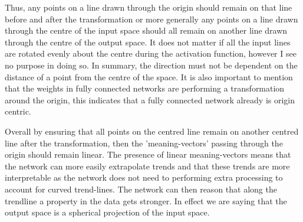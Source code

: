 \documentclass[onecolumn]{article}
\begin{document}
    Thus, any points on a line drawn through the origin should remain on that line before and after the transformation or more generally any points on a line drawn through the centre of the input space should all remain on another line drawn through the centre of the output space. It does not matter if all the input lines are rotated evenly about the centre during the activation function, however I see no purpose in doing so. In summary, the direction must not be dependent on the distance of a point from the centre of the space. It is also important to mention that the weights in fully connected networks are performing a transformation around the origin, this indicates that a fully connected network already is origin centric.

    Overall by ensuring that all points on the centred line remain on another centred line after the transformation, then the 'meaning-vectors' passing through the origin should remain linear. The presence of linear meaning-vectors means that the network can more easily extrapolate trends and that these trends are more interpretable as the network does not need to performing extra processing to account for curved trend-lines. The network can then reason that along the trendline a property in the data gets stronger. In effect we are saying that the output space is a spherical projection of the input space.

        
    
\end{document}
